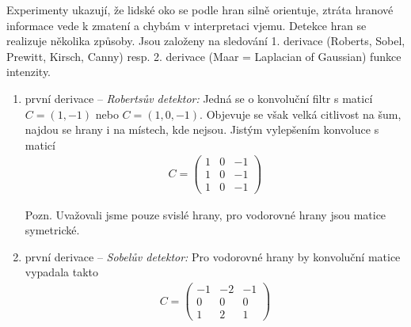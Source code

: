 Experimenty ukazují, že lidské oko se podle hran silně orientuje, ztráta hranové informace vede k zmatení a chybám v 
interpretaci vjemu. Detekce hran se realizuje několika způsoby. Jsou založeny na sledování 1. derivace (Roberts, Sobel, Prewitt, Kirsch, Canny) resp. 2. derivace (Maar = Laplacian of Gaussian) funkce intenzity.


\begin{enumerate}
\item první derivace -- \emph{Robertsův detektor:} Jedná se o konvoluční filtr s maticí $C=(1, -1)$ nebo $C=(1, 0, -1)$.
Objevuje se však velká citlivost na šum, najdou se hrany i na místech, kde nejsou. Jistým vylepšením konvoluce s maticí
\begin{align}
C=\left(\begin{array}{ccc}1&0&-1\\1&0&-1\\1&0&-1\end{array}\right)
\end{align}

Pozn. Uvažovali jsme pouze svislé hrany, pro vodorovné hrany jsou matice symetrické.

\item první derivace -- \emph{Sobelův detektor:} Pro vodorovné hrany by konvoluční matice vypadala takto
\begin{align}
C=\left(\begin{array}{ccc}-1&-2&-1\\0&0&0\\1&2&1\end{array}\right)
\end{align}


\end{enumerate}
